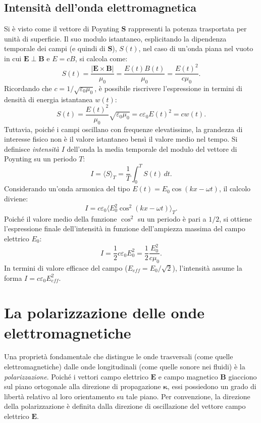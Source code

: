 \documentclass[a4paper,11pt]{report}
\begin{document}
\subsection{Intensità dell'onda elettromagnetica}

Si è visto come il vettore di Poynting $\bm{S}$ rappresenti la potenza trasportata per unità di superficie. Il suo modulo istantaneo, esplicitando la dipendenza temporale dei campi (e quindi di $\bm{S}$), $S(t)$, nel caso di un'onda piana nel vuoto in cui $\bm{E} \perp \bm{B}$ e $E = cB$, si calcola come:
\begin{equation}
S(t) = \frac{|\bm{E} \times \bm{B}|}{\mu_0} = \frac{E(t)B(t)}{\mu_0} = \frac{E(t)^2}{c\mu_0}.
\end{equation}
Ricordando che $c = 1/\sqrt{\varepsilon_0\mu_0}$, è possibile riscrivere l'espressione in termini di densità di energia istantanea $w(t)$:
\begin{equation}
S(t) = \frac{E(t)^2}{\mu_0} \sqrt{\varepsilon_0\mu_0} = c \varepsilon_0 E(t)^2 = c w(t).
\end{equation}
Tuttavia, poiché i campi oscillano con frequenze elevatissime, la grandezza di interesse fisico non è il valore istantaneo bensì il valore medio nel tempo. Si definisce \textit{intensità} $I$ dell'onda la media temporale del modulo del vettore di Poynting su un periodo $T$:
\begin{equation}
I = \langle S \rangle_T = \frac{1}{T} \int_0^T S(t) \, dt.
\end{equation}
Considerando un'onda armonica del tipo $E(t) = E_0 \cos(kx - \omega t)$, il calcolo diviene:
\begin{equation}
I = c \varepsilon_0 \langle E_0^2 \cos^2(kx - \omega t) \rangle_T.
\end{equation}
Poiché il valore medio della funzione $\cos^2$ su un periodo è pari a $1/2$, si ottiene l'espressione finale dell'intensità in funzione dell'ampiezza massima del campo elettrico $E_0$:
\begin{equation}
I = \frac{1}{2} c \varepsilon_0 E_0^2 = \frac{1}{2} \frac{E_0^2}{c\mu_0}.
\end{equation}
In termini di valore efficace del campo ($E_{eff} = E_0/\sqrt{2}$), l'intensità assume la forma $I = c \varepsilon_0 E_{eff}^2$.



\section{La polarizzazione delle onde elettromagnetiche}
Una proprietà fondamentale che distingue le onde trasversali (come quelle elettromagnetiche) dalle onde longitudinali (come quelle sonore nei fluidi) è la \textit{polarizzazione}. Poiché i vettori campo elettrico $\bm{E}$ e campo magnetico $\bm{B}$ giacciono sul piano ortogonale alla direzione di propagazione $\bm{\kappa}$, essi possiedono un grado di libertà relativo al loro orientamento su tale piano.
Per convenzione, la direzione della polarizzazione è definita dalla direzione di oscillazione del vettore campo elettrico $\bm{E}$.
\end{document}
